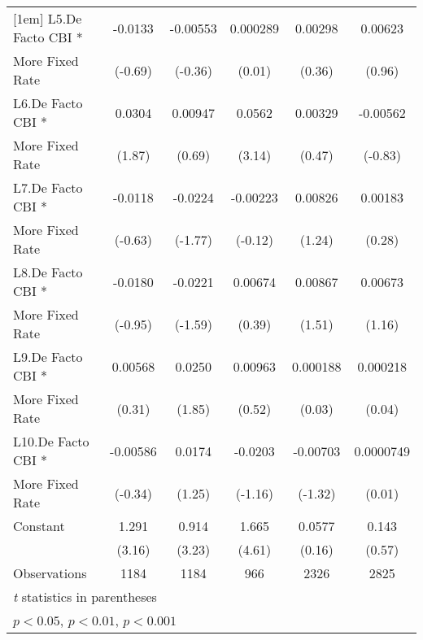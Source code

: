 {\begin{tabular}{l*{5}{c}}
[1em]
L5.De Facto CBI *   &     -0.0133         &    -0.00553         &    0.000289         &     0.00298         &     0.00623         \\
More Fixed Rate     &     (-0.69)         &     (-0.36)         &      (0.01)         &      (0.36)         &      (0.96)         \\
[1em]
L6.De Facto CBI *   &      0.0304         &     0.00947         &      0.0562\sym{**} &     0.00329         &    -0.00562         \\
More Fixed Rate     &      (1.87)         &      (0.69)         &      (3.14)         &      (0.47)         &     (-0.83)         \\
[1em]
L7.De Facto CBI *   &     -0.0118         &     -0.0224         &    -0.00223         &     0.00826         &     0.00183         \\
More Fixed Rate     &     (-0.63)         &     (-1.77)         &     (-0.12)         &      (1.24)         &      (0.28)         \\
[1em]
L8.De Facto CBI *   &     -0.0180         &     -0.0221         &     0.00674         &     0.00867         &     0.00673         \\
More Fixed Rate     &     (-0.95)         &     (-1.59)         &      (0.39)         &      (1.51)         &      (1.16)         \\
[1em]
L9.De Facto CBI *   &     0.00568         &      0.0250         &     0.00963         &    0.000188         &    0.000218         \\
More Fixed Rate     &      (0.31)         &      (1.85)         &      (0.52)         &      (0.03)         &      (0.04)         \\
[1em]
L10.De Facto CBI *  &    -0.00586         &      0.0174         &     -0.0203         &    -0.00703         &   0.0000749         \\
More Fixed Rate     &     (-0.34)         &      (1.25)         &     (-1.16)         &     (-1.32)         &      (0.01)         \\
[1em]
Constant            &       1.291\sym{**} &       0.914\sym{**} &       1.665\sym{***}&      0.0577         &       0.143         \\
                    &      (3.16)         &      (3.23)         &      (4.61)         &      (0.16)         &      (0.57)         \\
\hline
Observations        &        1184         &        1184         &         966         &        2326         &        2825         \\
\hline\hline
\multicolumn{6}{l}{\footnotesize \textit{t} statistics in parentheses}\\
\multicolumn{6}{l}{\footnotesize \sym{*} \(p<0.05\), \sym{**} \(p<0.01\), \sym{***} \(p<0.001\)}\\
\end{tabular}
}
